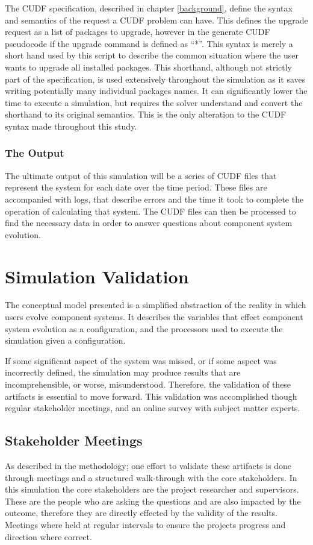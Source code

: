 The CUDF specification, described in chapter \ref{background}, define the syntax and semantics of the request a CUDF problem can have.
This defines the upgrade request as a list of packages to upgrade,
however in the generate CUDF pseudocode if the upgrade command is defined as ``*''.
This syntax is merely a short hand used by this script to describe the common situation where the user wants to upgrade all installed packages.
This shorthand, although not strictly part of the specification, is used extensively throughout the simulation as it saves writing potentially many individual packages names.
It can significantly lower the time to execute a simulation, but requires the solver understand and convert the shorthand to its original semantics.
This is the only alteration to the CUDF syntax made throughout this study.

\subsubsection{The Output}
The ultimate output of this simulation will be a series of CUDF files that represent the system for each date over the time period.
These files are accompanied with logs, that describe errors and the time it took to complete the operation of calculating that system.
The CUDF files can then be processed to find the necessary data in order to answer questions about component system evolution.

\section{Simulation Validation}
The conceptual model presented is a simplified abstraction of the reality in which users evolve component systems.
It describes the variables that effect component system evolution as a configuration,
and the processors used to execute the simulation given a configuration.

If some significant aspect of the system was missed, or if some aspect was incorrectly defined, the simulation may produce results that are incomprehensible,
or worse, misunderstood.
Therefore, the validation of these artifacts is essential to move forward. 
This validation was accomplished though regular stakeholder meetings, and an online survey with subject matter experts.

\subsection{Stakeholder Meetings}
As described in the methodology; one effort to validate these artifacts is done through meetings and a structured walk-through with the core stakeholders.
In this simulation the core stakeholders are the project researcher and supervisors.
These are the people who are asking the questions and are also impacted by the outcome, therefore they are directly effected by the validity of the results.
Meetings where held at regular intervals to ensure the projects progress and direction where correct.


